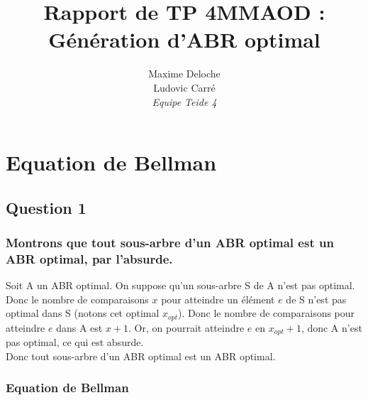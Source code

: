 \documentclass[a4paper, 10pt, french]{article}
\title{Rapport de TP 4MMAOD : Génération d'ABR optimal}
\author{
	Maxime Deloche \\
	Ludovic Carré \\
	\textit{Equipe Teide 4}
}
\begin{document}
\maketitle

\section{Equation de Bellman}

\subsection{Question 1}

\subsubsection{Montrons que tout sous-arbre d'un ABR optimal est un ABR optimal, par l'absurde.}

Soit A un ABR optimal. On suppose qu'un sous-arbre S de A n'est pas optimal.
Donc le nombre de comparaisons $x$ pour atteindre un élément $e$ de S n'est pas optimal dans S (notons cet optimal $x_{opt}$).
Donc le nombre de comparaisons pour atteindre $e$ dans A est $x + 1$. Or, on pourrait atteindre $e$ en $x_{opt} + 1$, donc A n'est pas optimal, ce qui est absurde. \\

Donc tout sous-arbre d'un ABR optimal est un ABR optimal.


\subsubsection{Equation de Bellman}
\end{document}

